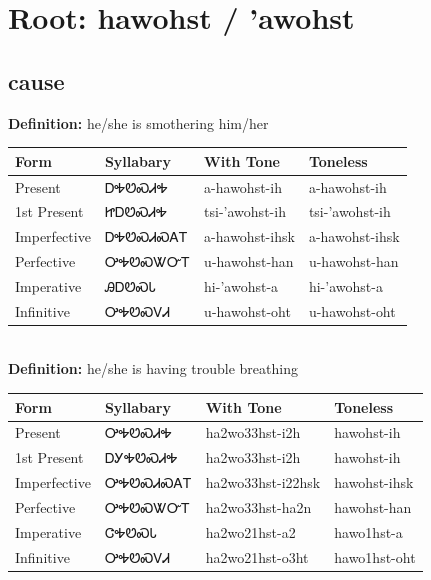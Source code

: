 \documentclass{article}%
\begin{document}
%
\normalsize%
\section*{Root: hawohst / 'awohst}%
\subsection*{cause}%
\textbf{Definition: }%
he/she is smothering him/her%
\\[0.5em]%
\begin{tabular}{|l|l|l|l|}%
\hline%
\textbf{Form}&\textbf{Syllabary}&\textbf{With Tone}&\textbf{Toneless}\\%
\hline%
Present&ᎠᎭᏬᏍᏗᎭ&a{-}hawohst{-}ih&a{-}hawohst{-}ih\\%
1st Present&ᏥᎠᏬᏍᏗᎭ&tsi{-}'awohst{-}ih&tsi{-}'awohst{-}ih\\%
Imperfective&ᎠᎭᏬᏍᏗᏍᎪᎢ&a{-}hawohst{-}ihsk&a{-}hawohst{-}ihsk\\%
Perfective&ᎤᎭᏬᏍᏔᏅᎢ&u{-}hawohst{-}han&u{-}hawohst{-}han\\%
Imperative&ᎯᎠᏬᏍᏓ&hi{-}'awohst{-}a&hi{-}'awohst{-}a\\%
Infinitive&ᎤᎭᏬᏍᏙᏗ&u{-}hawohst{-}oht&u{-}hawohst{-}oht\\%
\hline%
\end{tabular}%
\\[1em]%
\textbf{Definition: }%
he/she is having trouble breathing%
\\[0.5em]%
\begin{tabular}{|l|l|l|l|}%
\hline%
\textbf{Form}&\textbf{Syllabary}&\textbf{With Tone}&\textbf{Toneless}\\%
\hline%
Present&ᎤᎭᏬᏍᏗᎭ&ha2wo33hst{-}i2h&hawohst{-}ih\\%
1st Present&ᎠᎩᎭᏬᏍᏗᎭ&ha2wo33hst{-}i2h&hawohst{-}ih\\%
Imperfective&ᎤᎭᏬᏍᏗᏍᎪᎢ&ha2wo33hst{-}i22hsk&hawohst{-}ihsk\\%
Perfective&ᎤᎭᏬᏍᏔᏅᎢ&ha2wo33hst{-}ha2n&hawohst{-}han\\%
Imperative&ᏣᎭᏬᏍᏓ&ha2wo21hst{-}a2&hawo1hst{-}a\\%
Infinitive&ᎤᎭᏬᏍᏙᏗ&ha2wo21hst{-}o3ht&hawo1hst{-}oht\\%
\hline%
\end{tabular}%
\\[1em]%
\end{document}

